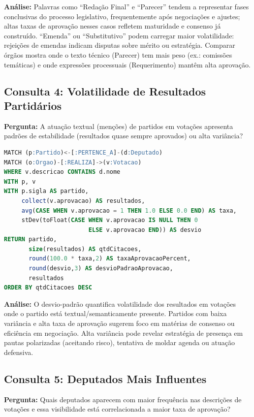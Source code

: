 \documentclass[12pt,a4paper]{article}
\begin{document}
\textbf{Análise:} Palavras como ``Redação Final'' e ``Parecer'' tendem a representar fases conclusivas do processo legislativo, frequentemente após negociações e ajustes; altas taxas de aprovação nesses casos refletem maturidade e consenso já construído. ``Emenda'' ou ``Substitutivo'' podem carregar maior volatilidade: rejeições de emendas indicam disputas sobre mérito ou estratégia. Comparar órgãos mostra onde o texto técnico (Parecer) tem mais peso (ex.: comissões temáticas) e onde expressões processuais (Requerimento) mantêm alta aprovação.

\subsection{Consulta 4: Volatilidade de Resultados Partidários}

\textbf{Pergunta:} A atuação textual (menções) de partidos em votações apresenta padrões de estabilidade (resultados quase sempre aprovados) ou alta variância?

\begin{lstlisting}[language=SQL,caption=Consulta Cypher 4]
MATCH (p:Partido)<-[:PERTENCE_A]-(d:Deputado)
MATCH (o:Orgao)-[:REALIZA]->(v:Votacao)
WHERE v.descricao CONTAINS d.nome
WITH p, v
WITH p.sigla AS partido,
     collect(v.aprovacao) AS resultados,
     avg(CASE WHEN v.aprovacao = 1 THEN 1.0 ELSE 0.0 END) AS taxa,
     stDev(toFloat(CASE WHEN v.aprovacao IS NULL THEN 0 
                        ELSE v.aprovacao END)) AS desvio
RETURN partido,
       size(resultados) AS qtdCitacoes,
       round(100.0 * taxa,2) AS taxaAprovacaoPercent,
       round(desvio,3) AS desvioPadraoAprovacao,
       resultados
ORDER BY qtdCitacoes DESC
\end{lstlisting}

\textbf{Análise:} O desvio-padrão quantifica volatilidade dos resultados em votações onde o partido está textual/semanticamente presente. Partidos com baixa variância e alta taxa de aprovação sugerem foco em matérias de consenso ou eficiência em negociação. Alta variância pode revelar estratégia de presença em pautas polarizadas (aceitando risco), tentativa de moldar agenda ou atuação defensiva.

\subsection{Consulta 5: Deputados Mais Influentes}

\textbf{Pergunta:} Quais deputados aparecem com maior frequência nas descrições de votações e essa visibilidade está correlacionada a maior taxa de aprovação?
\end{document}
